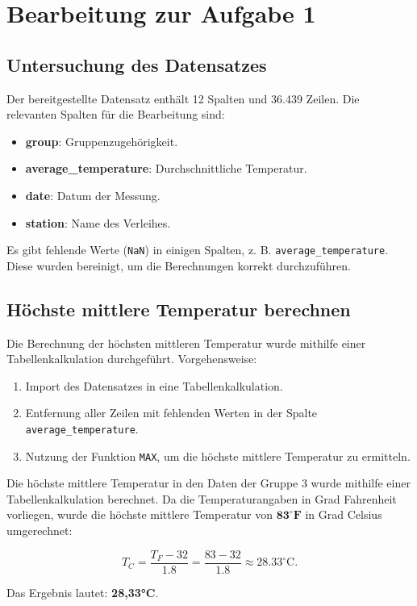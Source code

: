 \documentclass[a4paper,12pt]{article}
\begin{document}
\section{Bearbeitung zur Aufgabe 1}

\subsection{Untersuchung des Datensatzes}
Der bereitgestellte Datensatz enthält 12 Spalten und 36.439 Zeilen. Die relevanten Spalten für die Bearbeitung sind:
\begin{itemize}
    \item \textbf{group}: Gruppenzugehörigkeit.
    \item \textbf{average\_temperature}: Durchschnittliche Temperatur.
    \item \textbf{date}: Datum der Messung.
    \item \textbf{station}: Name des Verleihes.
\end{itemize}
Es gibt fehlende Werte (\texttt{NaN}) in einigen Spalten, z. B. \texttt{average\_temperature}. Diese wurden bereinigt, um die Berechnungen korrekt durchzuführen.

\subsection{Höchste mittlere Temperatur berechnen}

Die Berechnung der höchsten mittleren Temperatur wurde mithilfe einer Tabellenkalkulation durchgeführt. Vorgehensweise:
\begin{enumerate}
    \item Import des Datensatzes in eine Tabellenkalkulation.
    \item Entfernung aller Zeilen mit fehlenden Werten in der Spalte \texttt{average\_temperature}.
    \item Nutzung der Funktion \texttt{MAX}, um die höchste mittlere Temperatur zu ermitteln.
\end{enumerate}


Die höchste mittlere Temperatur in den Daten der Gruppe 3 wurde mithilfe einer Tabellenkalkulation berechnet. Da die Temperaturangaben in Grad Fahrenheit vorliegen, wurde die höchste mittlere Temperatur von \(\mathbf{83^\circ \text{F}}\) in Grad Celsius umgerechnet:

\[
T_C = \frac{T_F - 32}{1.8} = \frac{83 - 32}{1.8} \approx 28.33^\circ \text{C}.
\]

Das Ergebnis lautet: \textbf{28,33°C}.
\end{document}
